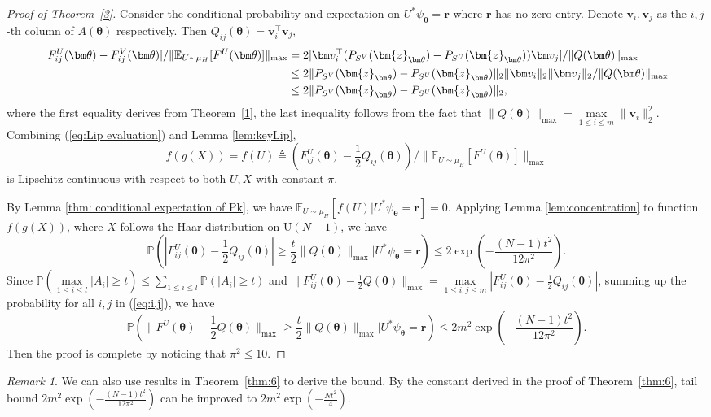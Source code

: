 \documentclass{amsart}
\theoremstyle{plain}
\theoremstyle{definition}
\theoremstyle{remark}
\newtheorem{remark}{Remark}
\newcommand{\thmref}[1]{Theorem~\ref{#1}}
\newcommand{\PP}{\mathbb{P}}
\newcommand{\EE}{\mathbb{E}}
\begin{document}
\begin{proof}[Proof of \thmref{3}]
    Consider the conditional probability and expectation on $U^*\psi_{\bm\theta}=\bm r$ where $\bm r$ has no zero entry.  
    Denote $\bm v_i,\bm v_j$ as the $i,j$-th column of $A(\bm\theta)$ respectively. Then $Q_{ij}(\bm\theta)=\bm v_i^\top\bm v_j$,  
\begin{align}
\label{eq:Lip evaluation}
    |F^U_{ij}(\bm\theta)-F^V_{ij}(\bm\theta)|/\|\EE_{U\sim\mu_H}[F^U(\bm\theta)]\|_{\max}&=2|\bm v_i^\top(P_{S^V}(\bm{z}_{\bm\theta})-P_{S^U}(\bm{z}_{\bm\theta}))\bm v_j|/\|Q(\bm\theta)\|_{\max}\notag\\
    &\leq 2\|P_{S^V}(\bm{z}_{\bm\theta})-P_{S^U}(\bm{z}_{\bm\theta})\|_2\|\bm v_i\|_2\|\bm v_j\|_2/\|Q(\bm\theta)\|_{\max}\notag\\
    &\leq 2\|P_{S^V}(\bm{z}_{\bm\theta})-P_{S^U}(\bm{z}_{\bm\theta})\|_2,
\end{align}
where the first equality derives from \thmref{1}, the last inequality follows from the fact that $\|Q(\bm\theta)\|_{\max}=\max\limits_{1\leq i\leq m}\|\bm v_i\|_2^2$. Combining (\ref{eq:Lip evaluation}) and Lemma \ref{lem:keyLip}, 
\[f(g(X))=f(U)\triangleq (F_{ij}^U(\bm\theta)-\frac{1}{2}Q_{ij}(\bm\theta))/\|\EE_{U\sim\mu_H}[F^U(\bm\theta)]\|_{\max}\] is Lipschitz continuous with respect to both $U,X$ with constant $\pi$. 

By Lemma \ref{thm: conditional expectation of Pk}, we have $\EE_{U\sim\mu_H}[f(U)|U^*\psi_{\bm\theta}=\bm r]=0$. 
Applying Lemma \ref{lem:concentration} to function $f(g(X))$, where $X$ follows the Haar distribution on $\mathrm U(N-1)$, we have 
\begin{equation}
\label{eq:i,j}
  \PP\left(|F^U_{ij}(\bm\theta)-\frac{1}{2}Q_{ij}(\bm\theta)|\geq \frac{t}{2}\|Q(\bm\theta)\|_{\max}|U^*\psi_{\bm\theta}=\bm r\right)\leq 2\exp\left(-\frac{(N-1)t^2}{12\pi^2}\right).  
\end{equation}
Since $\PP(\max\limits_{1\leq i\leq l}|A_i|\geq t)\leq \sum\limits_{1\leq i\leq l}\PP(|A_i|\geq t)$ and $\|F^U_{ij}(\bm\theta)-\frac{1}{2}Q(\bm\theta)\|_{\max}=\max\limits_{1\leq i,j\leq m}|F^U_{ij}(\bm\theta)-\frac{1}{2}Q_{ij}(\bm\theta)|$, summing up the probability for all $i,j$ in (\ref{eq:i,j}), we have 
\begin{equation}
    \PP\left(\|F^U(\bm\theta)-\frac{1}{2}Q(\bm\theta)\|_{\max}\geq\frac{t}{2} \|Q(\bm\theta)\|_{\max}|U^*\psi_{\bm\theta}=\bm r\right)\leq 2m^2\exp\left(-\frac{(N-1)t^2}{12\pi^2}\right).
\end{equation}
Then the proof is complete by noticing that $\pi^2\leq 10$.
\end{proof}
\begin{remark}
We can also use results in \thmref{thm:6} to derive the bound.
By the constant derived in the proof of \thmref{thm:6}, tail bound $2m^2\exp\left(-\frac{(N-1)t^2}{12\pi^2}\right)$ can be improved to $2m^2\exp\left(-\frac{Nt^2}{4}\right)$.    
\end{remark}
    
\end{document}
